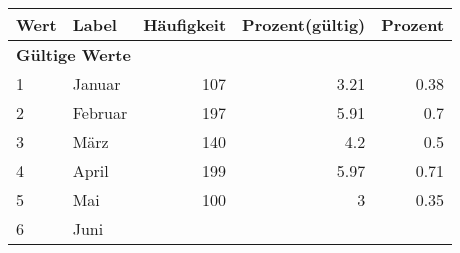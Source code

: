     \begin{longtable}{lXrrr}
     \toprule
     \textbf{Wert} & \textbf{Label} & \textbf{Häufigkeit} & \textbf{Prozent(gültig)} & \textbf{Prozent} \\
     \endhead
     \midrule
     \multicolumn{5}{l}{\textbf{Gültige Werte}}\\

     1 &
     \multicolumn{1}{X}{ Januar   } &


       \num{107} &
       \num[round-mode=places,round-precision=2]{3,21} &
         \num[round-mode=places,round-precision=2]{0,38} \\

     2 &
     \multicolumn{1}{X}{ Februar   } &


       \num{197} &
       \num[round-mode=places,round-precision=2]{5,91} &
         \num[round-mode=places,round-precision=2]{0,7} \\

     3 &
     \multicolumn{1}{X}{ März   } &


       \num{140} &
       \num[round-mode=places,round-precision=2]{4,2} &
         \num[round-mode=places,round-precision=2]{0,5} \\

     4 &
     \multicolumn{1}{X}{ April   } &


       \num{199} &
       \num[round-mode=places,round-precision=2]{5,97} &
         \num[round-mode=places,round-precision=2]{0,71} \\

     5 &
     \multicolumn{1}{X}{ Mai   } &


       \num{100} &
       \num[round-mode=places,round-precision=2]{3} &
         \num[round-mode=places,round-precision=2]{0,35} \\

     6 &
     \multicolumn{1}{X}{ Juni   } &



\end{longtable}
